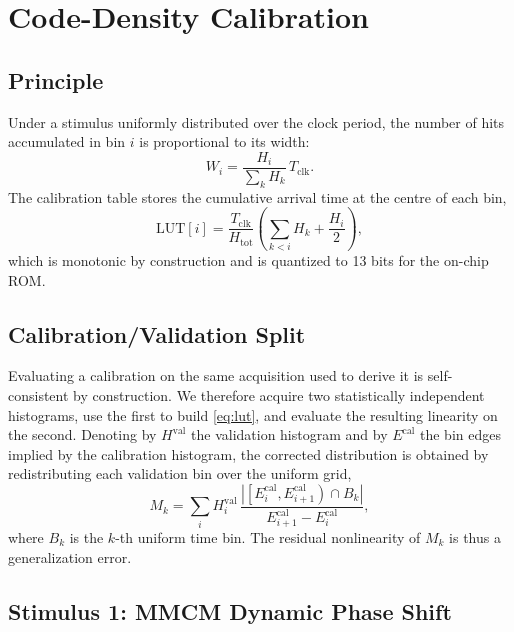 \documentclass[journal]{IEEEtran}
\begin{document}
\section{Code-Density Calibration}
\label{sec:cal}

\subsection{Principle}

Under a stimulus uniformly distributed over the clock period, the number of
hits accumulated in bin $i$ is proportional to its width:
\begin{equation}
W_i = \frac{H_i}{\sum_k H_k}\, T_{\mathrm{clk}} .
\end{equation}
The calibration table stores the cumulative arrival time at the centre of each
bin,
\begin{equation}
\mathrm{LUT}[i] = \frac{T_{\mathrm{clk}}}{H_{\mathrm{tot}}}
\left( \sum_{k<i} H_k + \frac{H_i}{2} \right),
\label{eq:lut}
\end{equation}
which is monotonic by construction and is quantized to 13 bits for the on-chip
ROM.

\subsection{Calibration/Validation Split}

Evaluating a calibration on the same acquisition used to derive it is
self-consistent by construction. We therefore acquire two statistically
independent histograms, use the first to build \eqref{eq:lut}, and evaluate the
resulting linearity on the second. Denoting by $H^{\mathrm{val}}$ the
validation histogram and by $E^{\mathrm{cal}}$ the bin edges implied by the
calibration histogram, the corrected distribution is obtained by redistributing
each validation bin over the uniform grid,
\begin{equation}
M_k = \sum_i H_i^{\mathrm{val}}\,
\frac{\left| \left[E^{\mathrm{cal}}_i,E^{\mathrm{cal}}_{i+1}\right)
\cap B_k \right|}
{E^{\mathrm{cal}}_{i+1}-E^{\mathrm{cal}}_{i}} ,
\end{equation}
where $B_k$ is the $k$-th uniform time bin. The residual nonlinearity of $M_k$
is thus a generalization error.

\subsection{Stimulus 1: MMCM Dynamic Phase Shift}
\end{document}
